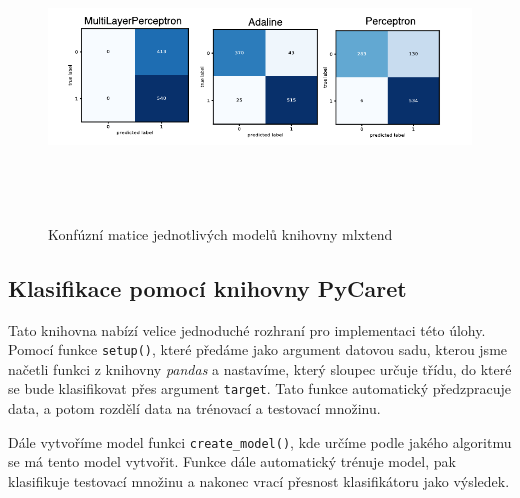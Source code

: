 \begin{figure}[h]\centering
  \centering
  \includegraphics[width=\textwidth,height=2.7in]{obrazky/mlp_mx.pdf}\\[1pt]
  \caption{Konfúzní matice jednotlivých modelů knihovny mlxtend}
  \label{konfuznimaticex}
\end{figure}

\subsection*{Klasifikace pomocí knihovny PyCaret}
Tato knihovna nabízí velice jednoduché rozhraní pro implementaci této úlohy. 
Pomocí funkce \verb|setup()|, které předáme jako argument datovou sadu, kterou jsme načetli funkci z knihovny \textit{pandas} a nastavíme, který sloupec určuje třídu, do které se bude klasifikovat přes argument \verb|target|. Tato funkce automatický předzpracuje data, a potom rozdělí data na trénovací a testovací množinu.

Dále vytvoříme model funkci \verb|create_model()|, kde určíme podle jakého algoritmu se má tento model vytvořit. Funkce dále automatický trénuje model, pak klasifikuje testovací množinu a nakonec vrací přesnost klasifikátoru jako výsledek. 

